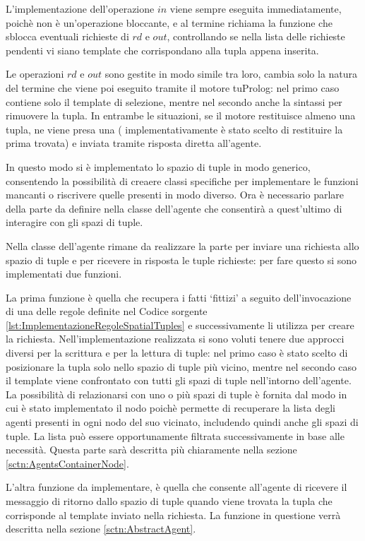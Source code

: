 L'implementazione dell'operazione $in$ viene sempre eseguita immediatamente, poichè non è un'operazione bloccante, e al termine richiama la funzione che sblocca eventuali richieste di $rd$ e $out$, controllando se nella lista delle richieste pendenti vi siano template che corrispondano alla tupla appena inserita.

Le operazioni $rd$ e $out$ sono gestite in modo simile tra loro, cambia solo la natura del termine che viene poi eseguito tramite il motore tuProlog: nel primo caso contiene solo il template di selezione, mentre nel secondo anche la sintassi per rimuovere la tupla.
In entrambe le situazioni, se il motore restituisce almeno una tupla, ne viene presa una ( implementativamente è stato scelto di restituire la prima trovata) e inviata tramite risposta diretta all'agente.

In questo modo si è implementato lo spazio di tuple in modo generico, consentendo la possibilità di creaere classi specifiche per implementare le funzioni mancanti o riscrivere quelle presenti in modo diverso.
Ora è necessario parlare della parte da definire nella classe dell'agente che consentirà a quest'ultimo di interagire con gli spazi di tuple.

Nella classe dell'agente rimane da realizzare la parte per inviare una richiesta allo spazio di tuple e per ricevere in risposta le tuple richieste: per fare questo si sono implementati due funzioni.

La prima funzione è quella che recupera i fatti `fittizi' a seguito dell'invocazione di una delle regole definite nel Codice sorgente \ref{lst:ImplementazioneRegoleSpatialTuples} e successivamente li utilizza per creare la richiesta. Nell'implementazione realizzata si sono voluti tenere due approcci diversi per la scrittura e per la lettura di tuple: nel primo caso è stato scelto di posizionare la tupla solo nello spazio di tuple più vicino, mentre nel secondo caso il template viene confrontato con tutti gli spazi di tuple nell'intorno dell'agente.
La possibilità di relazionarsi con uno o più spazi di tuple è fornita dal modo in cui è stato implementato il nodo poichè permette di recuperare la lista degli agenti presenti in ogni nodo del suo vicinato, includendo quindi anche gli spazi di tuple. La lista può essere opportunamente filtrata successivamente in base alle necessità. Questa parte sarà descritta più chiaramente nella sezione \ref{sctn:AgentsContainerNode}.

L'altra funzione da implementare, è quella che consente all'agente di ricevere il messaggio di ritorno dallo spazio di tuple quando viene trovata la tupla che corrisponde al template inviato nella richiesta. La funzione in questione verrà descritta nella sezione \ref{sctn:AbstractAgent}.
